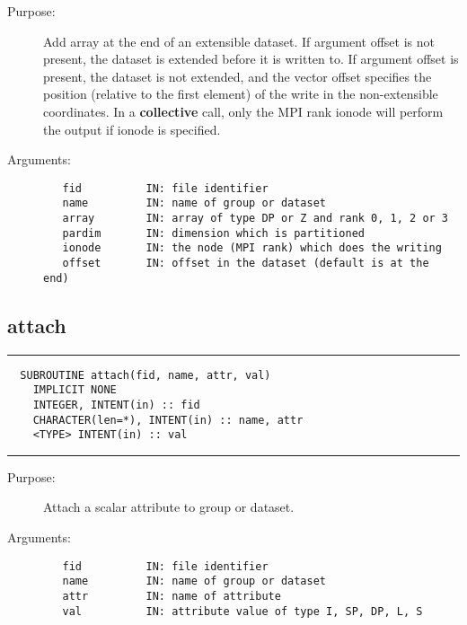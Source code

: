 \documentclass[a4paper]{article}
\begin{document}
\begin{description}
\item[Purpose:] \mbox{}

Add array at the end of an extensible dataset. If argument offset is not
present, the dataset is extended before it is written to. If argument offset
is present, the dataset is not extended, and the vector {\ttfamily offset} specifies the
position (relative to the first element) of the write in the non-extensible coordinates.
In a {\bfseries collective} call, only the MPI rank
{\ttfamily ionode} will perform the output if {\ttfamily ionode} is specified.

\item[Arguments:] \mbox{}

\begin{verbatim}
   fid          IN: file identifier
   name         IN: name of group or dataset
   array        IN: array of type DP or Z and rank 0, 1, 2 or 3
   pardim       IN: dimension which is partitioned
   ionode       IN: the node (MPI rank) which does the writing
   offset       IN: offset in the dataset (default is at the end)

\end{verbatim}


\end{description}





\subsection{attach}

\par
\addvspace{\medskipamount}
\nopagebreak\hrule
\begin{verbatim}
  SUBROUTINE attach(fid, name, attr, val)
    IMPLICIT NONE
    INTEGER, INTENT(in) :: fid
    CHARACTER(len=*), INTENT(in) :: name, attr
    <TYPE> INTENT(in) :: val
\end{verbatim}
\nopagebreak\hrule
\addvspace{\medskipamount}

\begin{description}
\item[Purpose:] \mbox{}

Attach a scalar attribute to group or dataset.

\item[Arguments:] \mbox{}

\begin{verbatim}
   fid          IN: file identifier
   name         IN: name of group or dataset
   attr         IN: name of attribute
   val          IN: attribute value of type I, SP, DP, L, S

\end{verbatim}


\end{description}
\end{document}
